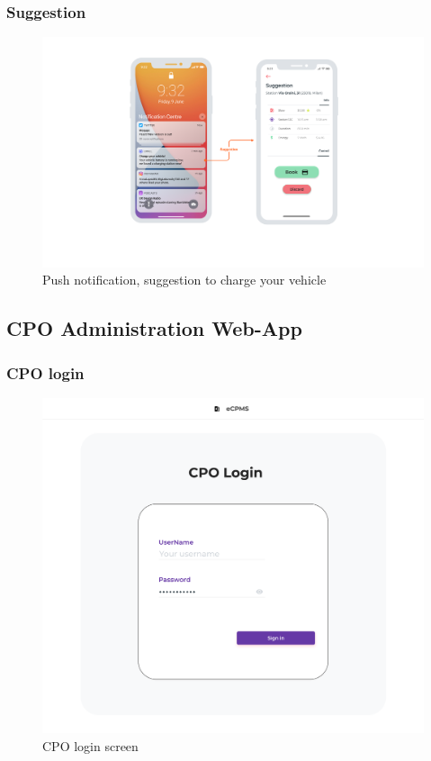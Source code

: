 \subsubsection{Suggestion}
\begin{center}
    \begin{figure}[H]
        \includegraphics[width=\textwidth]{./img/design/app/Suggestion.png}
        \caption{Push notification, suggestion to charge your vehicle}
    \end{figure}
\end{center}



\subsection{CPO Administration Web-App}

\subsubsection{CPO login}
\begin{center}
    \begin{figure}[H]
        \includegraphics[width=\textwidth]{./img/design/web/login.png}
        \caption{CPO login screen}
    \end{figure}
\end{center}


